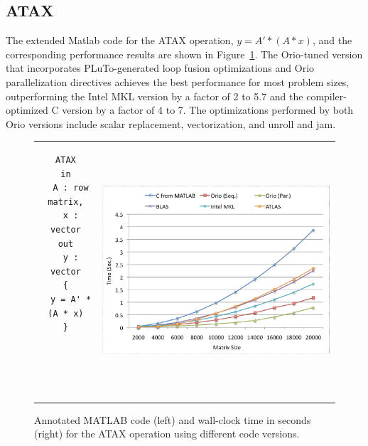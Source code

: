 \documentclass[runningheads]{llncs}
\begin{document}
\subsection{ATAX}

The extended Matlab code for the ATAX operation, $y = A' * (A * x)$, and the corresponding performance results are shown in Figure~\ref{fig:atax}. The Orio-tuned version that incorporates PLuTo-generated loop fusion optimizations and Orio parallelization directives achieves the best performance for most problem sizes, outperforming the Intel MKL version by a factor of 2 to 5.7 and the compiler-optimized C version by a factor of 4 to 7. The optimizations performed by both Orio versions include scalar replacement, vectorization, and unroll and jam.



\begin{figure}[htp]
\centering
\begin{tabular}{cc}
\begin{minipage}[b]{.3\textwidth}
\footnotesize
\begin{verbatim}
ATAX
in
  A : row matrix,
  x : vector
out
  y : vector
{
  y = A' * (A * x)
}





\end{verbatim}
\end{minipage}
&
\begin{minipage}[b]{.6\textwidth}
\includegraphics[width=\textwidth]{figures/atax.eps}
\end{minipage}\\
\end{tabular}
\caption{Annotated MATLAB code (left) and wall-clock time in seconds (right) for the ATAX operation using different code versions.}
\label{fig:atax}
\end{figure}
\end{document}
